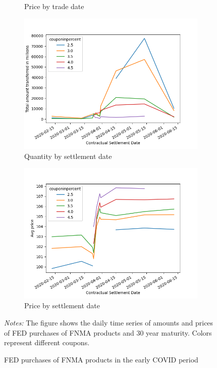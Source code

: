 \documentclass[11pt,a4paper]{article}
\begin{document}
\begin{figure}[h]
\begin{subfigure}[b]{0.49\textwidth}
      \caption{ Price by trade date}
     \end{subfigure}
    \begin{subfigure}[b]{0.49\textwidth}
        \includegraphics[width=0.998\textwidth]{../results/figures/FNMA_daily_purchases_contractualsettlementdate_amount.png}
        \caption{ Quantity by settlement date}
       \end{subfigure}
       \begin{subfigure}[b]{0.49\textwidth}
        \includegraphics[width=0.998\textwidth]{../results/figures/FNMA_daily_purchases_contractualsettlementdate_price.png}
        \caption{ Price by settlement date}
       \end{subfigure}
     \caption{FED purchases of FNMA products in the early COVID period} 
     \begin{minipage}{\textwidth}
        \footnotesize{\textit{Notes:} The figure shows the daily time series of amounts and  prices of FED purchases of FNMA products and 30 year maturity. Colors represent different coupons. } 
        \end{minipage}
\end{figure}
\end{document}
